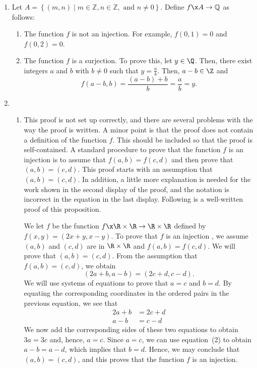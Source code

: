 \begin{enumerate}
\item Let $A = \left\{ ( m, n ) \mid m \in \mathbb{Z}, n \in \mathbb{Z}, \text{ and } n \ne 0 \right\}$.  Define $f\x A \to \mathbb{Q}$ as follows:

\begin{enumerate}
\item The function $f$ is not an injection.  For example, $f(0, 1) = 0$ and $f(0, 2) = 0$.  

\item The function $f$ is a surjection.  To prove this, let $y \in \Q$.  Then, there exist integers $a$ and $b$ with $b \ne 0$ such that $y = \frac{a}{b}$.  Then, $a - b \in \Z$ and
\[
f(a - b, b) = \frac{(a - b) + b}{b} = \frac{a}{b} = y.
\]
\end{enumerate}



\setcounter{equation}{0}
\item \begin{enumerate}
\item This proof is not set up correctly, and there are several problems with the way the proof is written.   A minor point is that the proof does not contain a definition of the function $f$.  This should be included so that the proof is self-contained.  A standard procedure to prove that the function $f$ is an injection is to assume that $f(a, b) = f(c, d)$ and then prove that $(a, b) = (c, d)$.  This proof starts with an assumption that $(a, b) = (c, d)$.  In addition, a little more explanation is needed for the work shown in the second display of the proof, and the notation is incorrect in the equation in the last display.  Following is a well-written proof of this proposition.


\quarter
\begin{myproof}
We let $f$ be the function $f\x\R \times \R \to \R \times \R$ defined by  
$f( {x, y} ) = ( {2x + y, x - y} )$.  To prove that $f$ is an injection , we assume 
$(a, b)$ and $(c, d)$ are in $\R \times \R$ and $f(a, b) = f(c, d)$.  We will prove that 
$(a, b) = (c, d)$.  From the assumption that $f(a, b) = (c, d)$, we obtain
\[
(2a + b, a - b) = (2c + d, c - d).
\]
We will use systems of equations to prove that $a = c$ and $b = d$.  By equating the corresponding coordinates in the ordered pairs in the previous equation, we see that
\begin{align}
2a + b &= 2c + d \\
 a - b &=  c - d
\end{align}
We now add the corresponding sides of these two equations to obtain $3a = 3c$ and, hence, $a = c$.
  Since $a = c$, we can use equation~(2) to obtain $a - b = a - d$, which implies that $b = d$. Hence, we may conclude that $(a, b) = (c, d)$, and this proves that the function $f$ is an injection.
\end{myproof}


\end{enumerate}
\end{enumerate}

